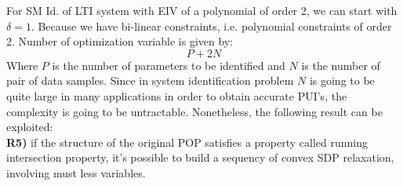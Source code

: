 For SM Id. of LTI system with EIV of a polynomial of order 2, we can start with $\delta =1$. Because we have bi-linear constraints, i.e. polynomial constraints of order 2. Number of optimization variable is given by:
\[
P + 2N
\]
Where $P$ is the number of parameters to be identified and $N$ is the number of pair of data samples. Since in system identification problem $N$ is going to be quite large in many applications in order to obtain accurate PUI's, the complexity is going to be untractable. Nonetheless, the following result can be exploited:\\
\textbf{R5)} if the structure of the original POP satisfies a property called running intersection property, it's possible to build a sequency of convex SDP relaxation, involving must less variables.

